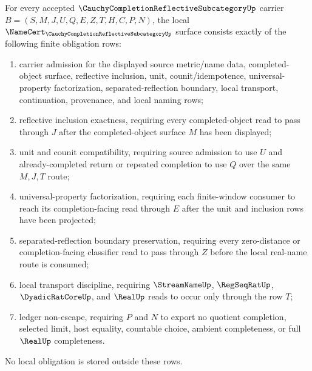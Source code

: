 \begin{theorem}
\label{thm:cauchy-completion-reflective-subcategory-namecert-obligations}
For every accepted $\CauchyCompletionReflectiveSubcategoryUp$ carrier $B=(S,M,J,U,Q,E,Z,T,H,C,P,N)$, the local $\NameCert_{\CauchyCompletionReflectiveSubcategoryUp}$ surface consists exactly of the following finite obligation rows:
\begin{enumerate}
\item carrier admission for the displayed source metric/name data, completed-object surface, reflective inclusion, unit, counit/idempotence, universal-property factorization, separated-reflection boundary, local transport, continuation, provenance, and local naming rows;
\item reflective inclusion exactness, requiring every completed-object read to pass through $J$ after the completed-object surface $M$ has been displayed;
\item unit and counit compatibility, requiring source admission to use $U$ and already-completed return or repeated completion to use $Q$ over the same $M,J,T$ route;
\item universal-property factorization, requiring each finite-window consumer to reach its completion-facing read through $E$ after the unit and inclusion rows have been projected;
\item separated-reflection boundary preservation, requiring every zero-distance or completion-facing classifier read to pass through $Z$ before the local real-name route is consumed;
\item local transport discipline, requiring $\StreamNameUp$, $\RegSeqRatUp$, $\DyadicRatCoreUp$, and $\RealUp$ reads to occur only through the row $T$;
\item ledger non-escape, requiring $P$ and $N$ to export no quotient completion, selected limit, host equality, countable choice, ambient completeness, or full $\RealUp$ completeness.
\end{enumerate}
No local obligation is stored outside these rows.
\end{theorem}
